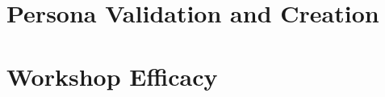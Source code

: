 \documentclass[doublespace,draft,nopageskip]{VTthesis} %
\begin{document}
	\begin{appendices}
		\chapter{Persona Validation and Creation} \label{app:persona_validation_creation}
            
		\chapter{Workshop Efficacy} \label{app:workshop_efficacy}
            
	\end{appendices}
\end{document}
